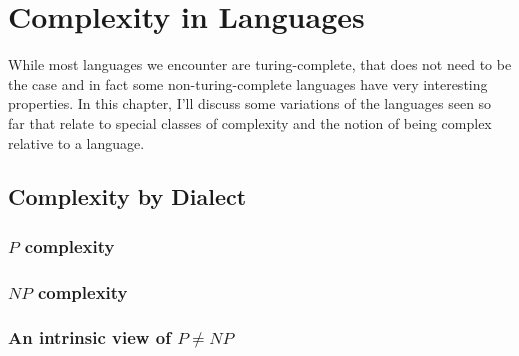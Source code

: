 \section{Complexity in Languages}
\label{sec:complexity}
While most languages we encounter are turing-complete, that does not need
to be the case and in fact some non-turing-complete languages have very
interesting properties. In this chapter, I'll discuss some variations of
the languages seen so far that relate to special classes of complexity and
the notion of being complex relative to a language.
\subsection{Complexity by Dialect} %
\label{sub:Complexity by Dialect}
\subsubsection{$P$ complexity} %
\label{ssub:P-complexity}

\subsubsection{$NP$ complexity} %
\label{ssub:NP-complexity}

\subsubsection{An intrinsic view of $P \neq NP$} %
\label{ssub:intrinsicPNP}

